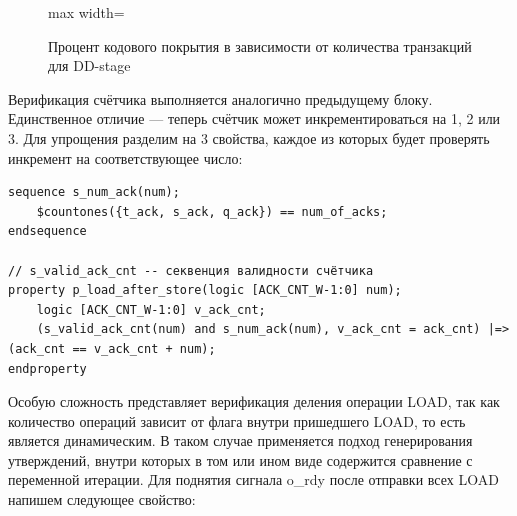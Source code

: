 \begin{figure}[h]
	\centering
		\begin{adjustbox}{max width=\textwidth}
		\end{adjustbox}
		\caption{Процент кодового покрытия в зависимости от количества транзакций для DD-stage}
		\label{fig:cov_dd}
\end{figure}

Верификация счётчика выполняется аналогично предыдущему блоку. Единственное отличие --- теперь счётчик может инкрементироваться на 1, 2 или 3. Для упрощения разделим на 3 свойства, каждое из которых будет проверять инкремент на соответствующее число: \newline 

\begin{minipage}{\textwidth}
\begin{lstlisting}
sequence s_num_ack(num);
    $countones({t_ack, s_ack, q_ack}) == num_of_acks;
endsequence 

// s_valid_ack_cnt -- секвенция валидности счётчика
property p_load_after_store(logic [ACK_CNT_W-1:0] num);
    logic [ACK_CNT_W-1:0] v_ack_cnt;
    (s_valid_ack_cnt(num) and s_num_ack(num), v_ack_cnt = ack_cnt) |=> (ack_cnt == v_ack_cnt + num);
endproperty
\end{lstlisting} 
\end{minipage}

Особую сложность представляет верификация деления операции LOAD, так как количество операций зависит от флага внутри пришедшего LOAD, то есть является динамическим. В таком случае применяется подход генерирования утверждений, внутри которых в том или ином виде содержится сравнение с переменной итерации. Для поднятия сигнала o\_rdy после отправки всех LOAD напишем следующее свойство: \newline

